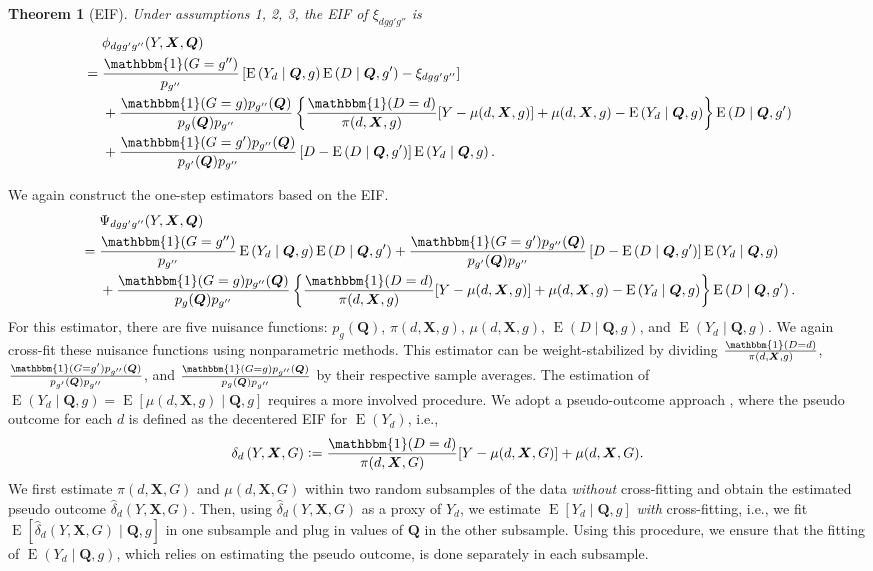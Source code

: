 \documentclass[12pt,a4paper]{article}
\newtheorem{prop}{Theorem}
\newcommand{\E}{\operatorname{E}}
\def\X{{\boldsymbol X}}
\def\Q{{\boldsymbol Q}}
\def\one{\mathbbm{1}}
\newcommand{\defeq}{\vcentcolon=}
\begin{document}
\begin{prop}[EIF]
Under assumptions 1, 2, 3, the EIF of $\xi_{dgg'g''}$ is 
\begin{align*}
     &\phantom{{}={}} \phi_{dgg'g''}(Y,\X,\Q) \\
    &=\frac{\one(G=g'')}{p_{g''}} \left[ \E \left(Y_d \mid \Q, g \right) \E \left(D \mid \Q, g' \right) - \xi_{dgg'g''} \right] \\
    &\phantom{{}={}} + \frac{\one(G=g) p_{g''}(\Q)}{p_g(\Q)p_{g''}} \left\{ \frac{\one(D=d)}{\pi(d,\X,g)} [Y-\mu(d,\X,g)]+\mu(d,\X,g) - \E \left(Y_d \mid \Q,g \right) \right\} \E \left(D \mid \Q,g' \right) \\
    &\phantom{{}={}} + \frac{\one(G=g')p_{g''}(\Q)}{p_{g'}(\Q)p_{g''}} \left[ D-\E \left(D \mid \Q, g' \right) \right] \E\left( Y_d \mid \Q, g \right).
\end{align*}
\end{prop}
We again construct the one-step estimators based on the EIF. 
\begin{align*}
    &\phantom{{}={}} \Psi_{dgg'g''}(Y,\X,\Q) \\
    &=\frac{\one(G=g'')}{p_{g''}} \E \left(Y_d \mid \Q, g \right) \E \left(D \mid \Q, g' \right) + \frac{\one(G=g')p_{g''}(\Q)}{p_{g'}(\Q)p_{g''}} \left[ D-\E \left(D \mid \Q, g' \right) \right] \E\left( Y_d \mid \Q, g \right) \\
    &\phantom{{}={}} + \frac{\one(G=g) p_{g''}(\Q)}{p_g(\Q)p_{g''}} \left\{ \frac{\one(D=d)}{\pi(d,\X,g)} [Y-\mu(d,\X,g)]+\mu(d,\X,g) - \E \left(Y_d \mid \Q,g \right) \right\} \E \left(D \mid \Q,g' \right).
\end{align*}
For this estimator, there are five nuisance functions: $p_g(\Q)$, $\pi(d,\X,g)$, $\mu(d,\X,g)$, $\E(D \mid \Q, g)$, and $\E(Y_d \mid \Q,g)$. We again cross-fit these nuisance functions using nonparametric methods. This estimator can be weight-stabilized by dividing $\frac{\one(D=d)}{\pi(d,\X,g)}$, $\frac{\one(G=g')p_{g''}(\Q)}{p_{g'}(\Q)p_{g''}}$, and $\frac{\one(G=g)p_{g''}(\Q)}{p_g(\Q)p_{g''}}$ by their respective sample averages. The estimation of $\E(Y_d \mid \Q,g)=\E[\mu(d,\X,g) \mid \Q,g]$ requires a more involved procedure. We adopt a pseudo-outcome approach \citep[e.g.,][]{van_der_laan_statistical_2006,semenova_debiased_2021}, where the pseudo outcome for each $d$ is defined as the decentered EIF for $\E(Y_d)$, i.e., 
$$ \delta_d \left(Y, \X,  G \right) \defeq \frac{\one(D=d)}{\pi(d, \X,G)} [Y-\mu(d,\X,G)] + \mu(d,\X,G).$$
We first estimate $\pi(d, \X,G)$ and $\mu(d,\X,G)$ within two random subsamples of the data \emph{without} cross-fitting and obtain the estimated pseudo outcome $\hat{\delta}_d \left(Y, \X,  G \right)$. Then, using $\hat{\delta}_d \left(Y, \X,  G \right)$ as a proxy of $Y_d$, we estimate $\E\left[Y_d \mid \Q, g \right]$ \emph{with} cross-fitting, i.e., we fit $\E\left[\hat{\delta}_d \left(Y, \X,  G \right) \mid \Q, g \right]$ in one subsample and plug in values of $\Q$ in the other subsample. Using this procedure, we ensure that the fitting of $\E(Y_d \mid \Q,g)$, which relies on estimating the pseudo outcome, is done separately in each subsample. 
\end{document}

